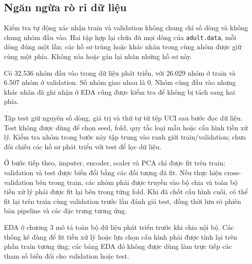 \subsection{Ngăn ngừa rò rỉ dữ liệu}
\label{subsec:4_2_3}
Kiểm tra tự động xác nhận train và validation không chung chỉ số dòng và không chung nhóm đầu vào. Hai tập hợp lại chứa đủ mọi dòng của \texttt{adult.data}, mỗi dòng đúng một lần; các hồ sơ trùng hoặc khác nhãn trong cùng nhóm được giữ cùng một phía. Không xóa hoặc gán lại nhãn những hồ sơ này.

Có 32.536 nhóm đầu vào trong dữ liệu phát triển, với 26.029 nhóm ở train và 6.507 nhóm ở validation. Số nhóm giao nhau là 0. Nhóm cùng đầu vào nhưng khác nhãn đã ghi nhận ở EDA cũng được kiểm tra để không bị tách sang hai phía.

Tập test giữ nguyên số dòng, giá trị và thứ tự từ tệp UCI sau bước đọc dữ liệu. Test không được dùng để chọn seed, fold, quy tắc loại mẫu hoặc cấu hình tiền xử lý. Kiểm tra nhóm trong bước này tập trung vào ranh giới train/validation; chưa đối chiếu các hồ sơ phát triển với test để lọc dữ liệu.

Ở bước tiếp theo, imputer, encoder, scaler và PCA chỉ được fit trên train; validation và test được biến đổi bằng các đối tượng đã fit. Nếu thực hiện cross-validation bên trong train, các nhóm phải được truyền vào bộ chia và toàn bộ tiền xử lý phải được fit lại bên trong từng fold. Khi đã chốt cấu hình cuối, có thể fit lại trên train cùng validation trước lần đánh giá test, đồng thời lưu rõ phiên bản pipeline và các đặc trưng tương ứng.

EDA ở chương 3 mô tả toàn bộ dữ liệu phát triển trước khi chia nội bộ. Các thống kê dùng để fit tiền xử lý hoặc lựa chọn cấu hình phải được tính lại trên phần train tương ứng; các bảng EDA đó không được dùng làm trực tiếp các tham số biến đổi cho validation hoặc test.

